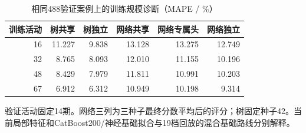 \begin{table}[!htbp]\centering
\caption{相同488验证案例上的训练规模诊断（MAPE / \%）}\label{tab:learning}
\small\setlength{\tabcolsep}{4pt}\renewcommand{\arraystretch}{1.15}
\begin{tabularx}{\linewidth}{r r r r r r}\toprule
训练活动 & 树共享 & 树独立 & 网络共享 & 网络专属头 & 网络独立 \\
\midrule
16 & 11.227 & 9.838 & 13.128 & 13.275 & 12.749 \\
32 & 8.765 & 8.093 & 12.010 & 11.155 & 10.196 \\
48 & 8.429 & 7.979 & 11.811 & 10.991 & 10.203 \\
67 & 6.912 & 6.312 & 10.949 & 10.198 & 9.314 \\
\bottomrule\end{tabularx}
\par\vspace{4pt}\begin{minipage}{\linewidth}\footnotesize 验证活动固定14期。网络三列为三种子最终分数平均后的评分；树固定种子42。当前局部特征和CatBoost200/神经基础拟合与19档回放的混合基础路线分别解释。\end{minipage}
\end{table}
